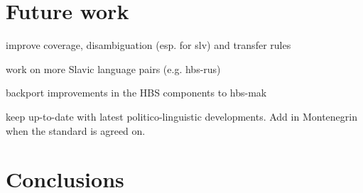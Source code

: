 \section{Future work}

improve coverage, disambiguation (esp. for slv) and transfer rules

work on more Slavic language pairs (e.g. hbs-rus)

backport improvements in the HBS components to hbs-mak

keep up-to-date with latest politico-linguistic developments. Add in
 Montenegrin when the standard is agreed on.


\section{Conclusions}
